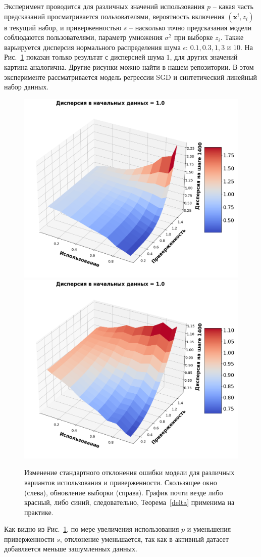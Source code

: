     Эксперимент проводится для различных значений использования $p$ -- какая часть предсказаний просматривается пользователями, вероятность включения $(\mathbf{x}^i, z_i)$ в текущий набор, и приверженностью $s$ -- насколько точно предсказания модели соблюдаются пользователями, параметр умножения $\sigma^2$ при выборке $z_i$. Также варьируется дисперсия нормального распределения шума $\epsilon$: $0.1, 0.3, 1, 3$ и $10$. На Рис.~\ref{3D} показан только результат с дисперсией шума $1$, для других значений картина аналогична. Другие рисунки можно найти в нашем репозитории. В этом эксперименте рассматривается модель регрессии SGD и синтетический линейный набор данных.

    \begin{figure}[h!]
        \centering
        \includegraphics[width=0.49\linewidth]{pictures/3D_sw_1.0_synthetic_sgd_model_50.png}
        \includegraphics[width=0.49\linewidth]{pictures/3D_su_1.0_synthetic_sgd_model_50.png}
        
        \caption{Изменение стандартного отклонения ошибки модели для различных вариантов использования и приверженности. Скользящее окно (слева), обновление выборки (справа). График почти везде либо красный, либо синий, следовательно, Теорема~\ref{delta} применима на практике.}
        \label{3D}
    \end{figure}

    Как видно из Рис.~\ref{3D}, по мере увеличения использования $p$ и уменьшения приверженности $s$, отклонение уменьшается, так как в активный датасет добавляется меньше зашумленных данных.

